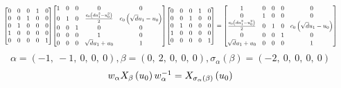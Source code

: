 \documentclass[11pt]{article}
\theoremstyle{definition}
\begin{document}
\[
\scaletoalign{\textwidth}{{\left[\begin{matrix}0 & 0 & 0 & 1 & 0\\0 & 0 & 1 & 0 & 0\\0 & 1 & 0 & 0 & 0\\1 & 0 & 0 & 0 & 0\\0 & 0 & 0 & 0 & 1\end{matrix}\right]} {\left[\begin{matrix}1 & 0 & 0 & 0 & 0\\0 & 1 & 0 & \frac{c_{0} \left(d u_{1}^{2} - u_{0}^{2}\right)}{2} & c_{0} \left(\sqrt{d} u_{1} - u_{0}\right)\\0 & 0 & 1 & 0 & 0\\0 & 0 & 0 & 1 & 0\\0 & 0 & 0 & \sqrt{d} u_{1} + u_{0} & 1\end{matrix}\right]} {\left[\begin{matrix}0 & 0 & 0 & 1 & 0\\0 & 0 & 1 & 0 & 0\\0 & 1 & 0 & 0 & 0\\1 & 0 & 0 & 0 & 0\\0 & 0 & 0 & 0 & 1\end{matrix}\right]} = {\left[\begin{matrix}1 & 0 & 0 & 0 & 0\\0 & 1 & 0 & 0 & 0\\\frac{c_{0} \left(d u_{1}^{2} - u_{0}^{2}\right)}{2} & 0 & 1 & 0 & c_{0} \left(\sqrt{d} u_{1} - u_{0}\right)\\0 & 0 & 0 & 1 & 0\\\sqrt{d} u_{1} + u_{0} & 0 & 0 & 0 & 1\end{matrix}\right]}}
\]
\[
\alpha = \left( -1, \  -1, \  0, \  0, \  0\right), \beta = \left( 0, \  2, \  0, \  0, \  0\right), \sigma_{\alpha}(\beta) = \left( -2, \  0, \  0, \  0, \  0\right)
\]
\[
\scaletoalign{\textwidth}{w_{\alpha} X_{\beta}\left(u_{0}\right) w_{\alpha}^{-1} = X_{\sigma_{\alpha}\left(\beta\right)}\left(u_{0}\right)}
\]
\end{document}
